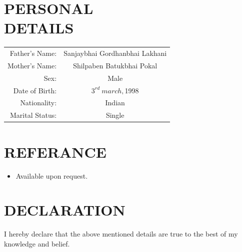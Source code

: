 \documentclass[margin]{res}
\begin{document}
    \section{PERSONAL \\ DETAILS}
    \begin{tabular}{r c}       
        Father's Name: & Sanjaybhai Gordhanbhai Lakhani\\
        Mother's Name: & Shilpaben Batukbhai Pokal\\
        Sex: & Male\\
        Date of Birth: & $3^{rd} \ march, $1998\\
        Nationality: & Indian \\
        Marital Status: & Single \\
    \end{tabular}

    \section{REFERANCE}
    \begin{itemize}        
        \item Available upon request.
    \end{itemize}
    \section{DECLARATION}
    {I hereby declare that the above mentioned details are true to the best of my knowledge and belief.}
\end{document}
